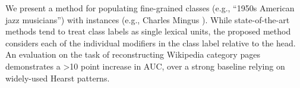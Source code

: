 We present a method for populating fine-grained classes (e.g., ``1950s American jazz musicians'') with instances (e.g., Charles Mingus ). While state-of-the-art methods tend to treat class labels as single lexical units, the proposed method considers each of the individual modifiers in the class label relative to the head. An evaluation on the task of reconstructing Wikipedia category pages demonstrates a >10 point increase in AUC, over a strong baseline relying on widely-used Hearst patterns.

